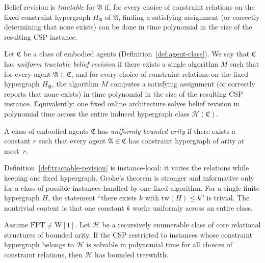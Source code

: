 \documentclass[runningheads]{llncs}
\begin{document}
\begin{definition}\label{def:tractable-revision}
Belief revision is \emph{tractable} for $\mathfrak{A}$ if, for every choice of constraint relations on the fixed constraint hypergraph $H_{\mathfrak{A}}$ of $\mathfrak{A}$, finding a satisfying assignment (or correctly determining that none exists) can be done in time polynomial in the size of the resulting CSP instance.
\end{definition}

\begin{definition}\label{def:uniform-tractable-revision}
Let $\mathfrak{C}$ be a class of embodied agents (Definition~\ref{def:agent-class}).
We say that $\mathfrak{C}$ has \emph{uniform tractable belief revision} if there exists a single algorithm $M$ such that for every agent $\mathfrak{A} \in \mathfrak{C}$, and for every choice of constraint relations on the fixed hypergraph $H_{\mathfrak{A}}$, the algorithm $M$ computes a satisfying assignment (or correctly reports that none exists) in time polynomial in the size of the resulting CSP instance.
Equivalently: one fixed online architecture solves belief revision in polynomial time across the entire induced hypergraph class $\mathcal{H}(\mathfrak{C})$.
\end{definition}

\begin{definition}\label{def:class-bounded-arity}
A class of embodied agents $\mathfrak{C}$ has \emph{uniformly bounded arity} if there exists a constant $r$ such that every agent $\mathfrak{A} \in \mathfrak{C}$ has constraint hypergraph of arity at most~$r$.
\end{definition}

\begin{remark}\label{rem:grohe-class}
Definition~\ref{def:tractable-revision} is instance-local: it varies the relations while keeping one fixed hypergraph. Grohe's theorem is stronger and informative only for a class of possible instances handled by one fixed algorithm. For a single finite hypergraph $H$, the statement ``there exists $k$ with $\mathrm{tw}(H) \leq k$'' is trivial. The nontrivial content is that one constant $k$ works uniformly across an entire class.
\end{remark}

\begin{theorem}\label{thm:grohe}
Assume $\mathrm{FPT} \neq \mathrm{W}[1]$.
Let $\mathcal{H}$ be a recursively enumerable class of core relational structures of bounded arity.
If the CSP restricted to instances whose constraint hypergraph belongs to $\mathcal{H}$ is solvable in polynomial time for all choices of constraint relations, then $\mathcal{H}$ has bounded treewidth.
\end{theorem}
\end{document}
